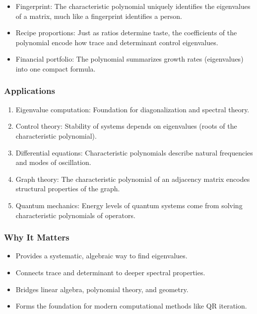 \documentclass[
  letterpaper,
  DIV=11,
  numbers=noendperiod]{scrreprt}
\providecommand{\tightlist}{%
  \setlength{\itemsep}{0pt}\setlength{\parskip}{0pt}}
\begin{document}
\begin{itemize}
\tightlist
\item
  Fingerprint: The characteristic polynomial uniquely identifies the
  eigenvalues of a matrix, much like a fingerprint identifies a person.
\item
  Recipe proportions: Just as ratios determine taste, the coefficients
  of the polynomial encode how trace and determinant control
  eigenvalues.
\item
  Financial portfolio: The polynomial summarizes growth rates
  (eigenvalues) into one compact formula.
\end{itemize}

\subsubsection{Applications}\label{applications-24}

\begin{enumerate}
\def\labelenumi{\arabic{enumi}.}
\tightlist
\item
  Eigenvalue computation: Foundation for diagonalization and spectral
  theory.
\item
  Control theory: Stability of systems depends on eigenvalues (roots of
  the characteristic polynomial).
\item
  Differential equations: Characteristic polynomials describe natural
  frequencies and modes of oscillation.
\item
  Graph theory: The characteristic polynomial of an adjacency matrix
  encodes structural properties of the graph.
\item
  Quantum mechanics: Energy levels of quantum systems come from solving
  characteristic polynomials of operators.
\end{enumerate}

\subsubsection{Why It Matters}\label{why-it-matters-58}

\begin{itemize}
\tightlist
\item
  Provides a systematic, algebraic way to find eigenvalues.
\item
  Connects trace and determinant to deeper spectral properties.
\item
  Bridges linear algebra, polynomial theory, and geometry.
\item
  Forms the foundation for modern computational methods like QR
  iteration.
\end{itemize}
\end{document}
